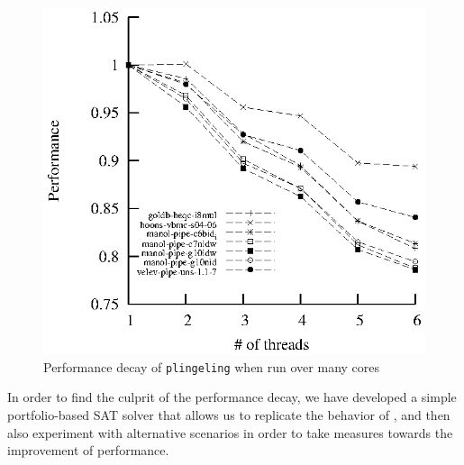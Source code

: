 \documentclass{llncs}
\begin{document}
\begin{figure}[tp]
  \centering
  \includegraphics[scale=1]{plingeling_6cores_speedup}
  \caption{Performance decay of {\tt plingeling} when run over many cores}
  \label{fig:decay}
\end{figure}

In order to find the culprit of the performance decay, we have
developed a simple portfolio-based SAT solver that allows us to
replicate the behavior of \pling, and then also experiment with
alternative scenarios in order to take measures towards the
improvement of performance.
\end{document}
